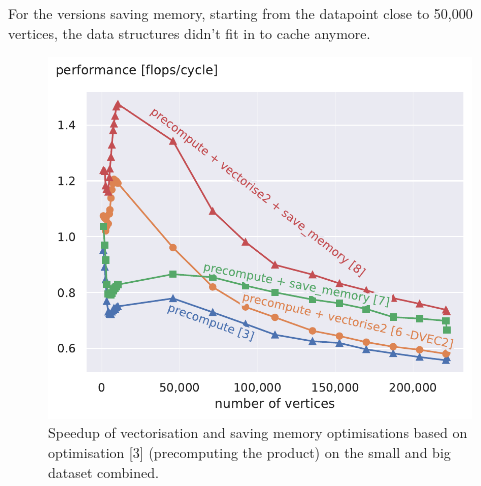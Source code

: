 \documentclass[letterpaper]{article}
\begin{document}
For the versions saving memory, starting from the datapoint close to 50,000 vertices, the data structures didn't fit in to cache anymore.
\begin{figure}\centering
	\includegraphics[scale=0.59]{img/performance[3][6][7][8]_both.pdf}
	\caption{Speedup of vectorisation and saving memory optimisations based on optimisation [3] (precomputing the product) on the small and big dataset combined. \label{cpctVectPerformanceBoth}}
\end{figure}
\end{document}

